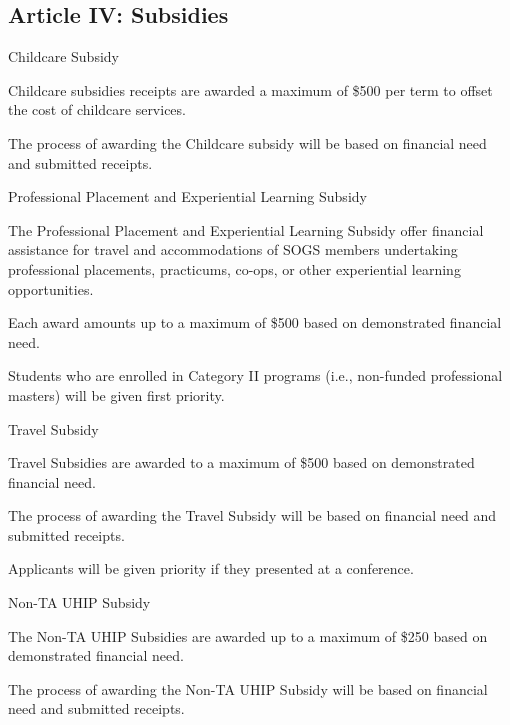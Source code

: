 \subsection{Article IV: Subsidies}
\begin{longenum}[ label*=\thesubsection.\arabic*., align=left]
	\item Childcare Subsidy
		\begin{longenum}[ label*=\arabic*., align=left]	
		\item Childcare subsidies receipts are awarded a maximum of \$500 per term to offset the cost of childcare services.
		\item The process of awarding the Childcare subsidy will be based on financial need and submitted receipts.
		\end{longenum}
	\item Professional Placement and Experiential Learning Subsidy
		\begin{longenum}[ label*=\arabic*., align=left]	
		\item The Professional Placement and Experiential Learning Subsidy offer financial assistance for travel and accommodations of SOGS members undertaking professional placements, practicums, co-ops, or other experiential learning opportunities. 
		\item Each award amounts up to a maximum of \$500 based on demonstrated financial need.
		\item Students who are enrolled in Category II programs (i.e., non-funded professional masters) will be given first priority.
		\end{longenum}
	\item Travel Subsidy
		\begin{longenum}[ label*=\arabic*., align=left]	
		\item Travel Subsidies are awarded to a maximum of \$500 based on demonstrated financial need.
		\item The process of awarding the Travel Subsidy will be based on financial need and submitted receipts.
		\item Applicants will be given priority if they presented at a conference.
		\end{longenum}
	\item Non-TA UHIP Subsidy
		\begin{longenum}[ label*=\arabic*., align=left]	
		\item The Non-TA UHIP Subsidies are awarded up to a maximum of \$250 based on demonstrated financial need.
		\item The process of awarding the Non-TA UHIP Subsidy will be based on financial need and submitted receipts.	

\end{longenum}
\end{longenum}
